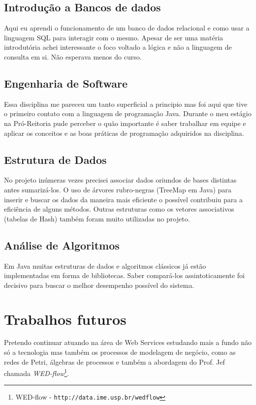 \subsection{Introdução a Bancos de dados}
Aqui eu aprendi o funcionamento de um banco de dados relacional e como usar a linguagem SQL para interagir com o mesmo.
Apesar de ser uma matéria introdutória achei interessante o foco voltado a lógica e não a linguagem de consulta em si. Não esperava menos do curso.

\subsection{Engenharia de Software}
Essa disciplina me pareceu um tanto superficial a principio mas foi aqui que tive o primeiro contato com a linguagem de programação Java. Durante o meu estágio na Pró-Reitoria pude perceber o quão importante é saber trabalhar em equipe e aplicar os conceitos e as boas práticas de programação adquiridos na disciplina.

\subsection{Estrutura de Dados}
No projeto inúmeras vezes precisei associar dados oriundos de bases distintas antes sumarizá-los. O uso de árvores rubro-negras (TreeMap em Java) para inserir e buscar os dados da maneira mais eficiente o possível contribuiu para a eficiência de alguns métodos. Outras estruturas como os vetores associativos (tabelas de Hash) também foram muito utilizadas no projeto.

\subsection{Análise de Algoritmos}

Em Java muitas estruturas de dados e algoritmos clássicos já estão implementadas em forma de bibliotecas. Saber compará-los assintoticamente foi decisivo para buscar o melhor desempenho possível do sistema.

\section{Trabalhos futuros}
Pretendo continuar atuando na área de Web Services estudando mais a fundo não só a tecnologia mas também os processos de modelagem de negócio, como as redes de Petri, álgebras de processos e também a abordagem do Prof. Jef chamada \emph{WED-flow}\footnote{WED-flow - \texttt{http://data.ime.usp.br/wedflow}}. 


